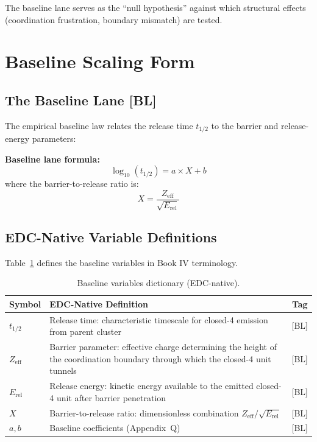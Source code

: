 The baseline lane serves as the ``null hypothesis'' against which structural
effects (coordination frustration, boundary mismatch) are tested.

\section{Baseline Scaling Form}
\label{sec:gn:baseline}

\subsection{The Baseline Lane [BL]}

The empirical baseline law relates the release time $t_{1/2}$ to the barrier
and release-energy parameters:

\begin{derivationbox}
    \textbf{Baseline lane formula:}
    \begin{equation}
        \log_{10}(t_{1/2}) = a \times X + b
        \label{eq:baseline_lane}
    \end{equation}
    where the barrier-to-release ratio is:
    \begin{equation}
        X = \frac{Z_{\text{eff}}}{\sqrt{E_{\text{rel}}}}
        \label{eq:barrier_ratio}
    \end{equation}
    \tagBL
\end{derivationbox}

\subsection{EDC-Native Variable Definitions}

Table~\ref{tab:variables} defines the baseline variables in Book IV terminology.

\begin{table}[h]
\centering
\caption{Baseline variables dictionary (EDC-native).}
\label{tab:variables}
\begin{tabular}{lp{7cm}c}
    \toprule
    Symbol & EDC-Native Definition & Tag \\
    \midrule
    $t_{1/2}$ & Release time: characteristic timescale for closed-4
               emission from parent cluster & [BL] \\
    $Z_{\text{eff}}$ & Barrier parameter: effective charge determining
                       the height of the coordination boundary through
                       which the closed-4 unit tunnels & [BL] \\
    $E_{\text{rel}}$ & Release energy: kinetic energy available to the
                       emitted closed-4 unit after barrier penetration & [BL] \\
    $X$ & Barrier-to-release ratio: dimensionless combination
          $Z_{\text{eff}}/\sqrt{E_{\text{rel}}}$ & [BL] \\
    $a, b$ & Baseline coefficients (Appendix~Q) & [BL] \\
    \bottomrule
\end{tabular}
\end{table}

